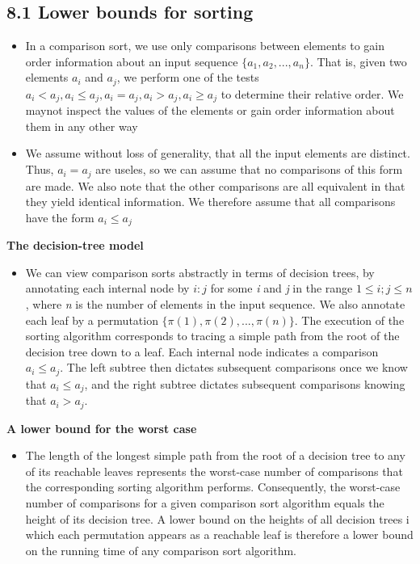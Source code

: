 \documentclass{report}
\begin{document}
\subsection*{8.1 Lower bounds for sorting}
\begin{itemize}
    \item In a comparison sort, we use only comparisons between elements to gain order information about an input sequence $\{a_1, a_2, ..., a_n\}$. That is, given two elements $a_i$ and $a_j$, we perform one of the tests $a_i < a_j, a_i \leq a_j, a_i = a_j, a_i > a_j, a_i \geq a_j$ to determine their relative order. We maynot inspect the values of the elements or gain order information about them in any other way
    \item We assume without loss of generality, that all the input elements are distinct. Thus, $a_i = a_j$ are useles, so we can assume that no comparisons of this form are made. We also note that the other comparisons are all equivalent in that they yield identical information. We therefore assume that all comparisons have the form $a_i \leq a_j$
\end{itemize}
\textbf{The decision-tree model}
\begin{itemize}
    \item We can view comparison sorts abstractly in terms of decision trees, by annotating each internal node by $i:j$ for some \textit{i} and \textit{j} in the range $1 \leq i; j \leq n$, where \textit{n} is the number of elements in the input sequence. We also annotate each leaf by a permutation $\{\pi(1), \pi(2), ..., \pi(n)\}$. The execution of the sorting algorithm corresponds to tracing a simple path from the root of the decision tree down to a leaf. Each internal node indicates a comparison $a_i \leq a_j$. The left subtree then dictates subsequent comparisons once we know that $a_i \leq a_j$, and the right subtree dictates subsequent comparisons knowing that $a_i > a_j$.
\end{itemize}
\textbf{A lower bound for the worst case}
\begin{itemize}
    \item The length of the longest simple path from the root of a decision tree to any of its reachable leaves represents the worst-case number of comparisons that the corresponding sorting algorithm performs. Consequently, the worst-case number of comparisons for a given comparison sort algorithm equals the height of its decision tree. A lower bound on the heights of all decision trees i which each permutation appears as a reachable leaf is therefore a lower bound on the running time of any comparison sort algorithm.
\end{itemize}
\end{document}
